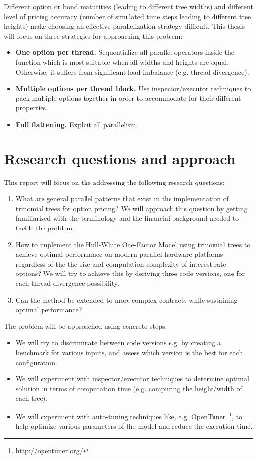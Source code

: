 Different option or bond maturities (leading to different tree widths) and different level of pricing accuracy (number of simulated time steps leading to different tree heights) make choosing an effective parallelization strategy difficult. This thesis will focus on three strategies for approaching this problem:
\begin{itemize}
    \item \textbf{One option per thread.} Sequentialize all parallel operators inside the function which is most suitable when all widths and heights are equal. Otherwise, it suffers from significant load imbalance (e.g. thread divergence).
    
    \item \textbf{Multiple options per thread block.} Use inspector/executor techniques to pack multiple options together in order to accommodate for their different properties.
    
    \item \textbf{Full flattening.} Exploit all parallelism.
    
\end{itemize}
\section{Research questions and approach}
This report will focus on the addressing the following research questions:
\begin{enumerate}
    \item What are general parallel patterns that exist in the implementation of trinomial trees for option pricing? We will approach this question by getting familiarized with the terminology and the financial background needed to tackle the problem.
    \item How to implement the Hull-White One-Factor Model using trinomial trees to achieve optimal performance on modern parallel hardware platforms regardless of the the size and computation complexity of interest-rate options? We will try to achieve this by deriving three code versions, one for each thread divergence possibility.
    \item Can the method be extended to more complex contracts while sustaining optimal performance? 
\end{enumerate}
The problem will be approached using concrete steps:
\begin{itemize}
    \item We will try to discriminate between code versions e.g. by creating a benchmark for various inputs, and assess which version is the best for each configuration.
    \item We will experiment with inspector/executor techniques to determine optimal solution in terms of computation time (e.g. computing the height/width of each tree).
    \item We will experiment with auto-tuning techniques like, e.g. OpenTuner~\footnote{http://opentuner.org/}, to help optimize various parameters of the model and reduce the execution time.
\end{itemize}

